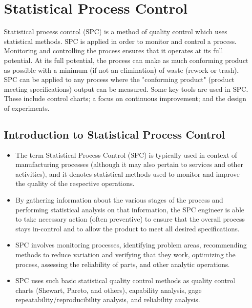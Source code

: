 \documentclass[]{report}
\title{}
\author{}
\begin{document}
\large
\tableofcontents
\newpage
\chapter{Statistical Process Control}

Statistical process control (SPC) is a method of quality control which uses statistical methods. SPC is applied in order to monitor and control a process. Monitoring and controlling the process ensures that it operates at its full potential. At its full potential, the process can make as much conforming product as possible with a minimum (if not an elimination) of waste (rework or trash). SPC can be applied to any process where the "conforming product" (product meeting specifications) output can be measured. Some key tools are used in SPC. These include control charts; a focus on continuous improvement; and the design of experiments.

\section{Introduction to Statistical Process Control}
\begin{itemize}
	\item The term Statistical Process Control (SPC) is typically used in context of manufacturing processes (although it may also pertain to services and other activities), and it denotes statistical methods used to monitor and improve the quality of the respective operations. 
	
	\item By gathering information about the various stages of the process and performing statistical analysis on that information, the SPC engineer is able to take necessary action (often preventive) to ensure that the overall process stays in-control and to allow the product to meet all desired specifications.
	
	\item SPC involves monitoring processes, identifying problem areas, recommending methods to reduce variation and verifying that they work, optimizing the process, assessing the reliability of parts, and other analytic operations. 
	
	\item SPC uses such basic statistical quality control methods as quality control charts (Shewart, Pareto, and others), capability analysis, gage repeatability/reproducibility analysis, and reliability analysis.
\end{itemize}
\end{document}
